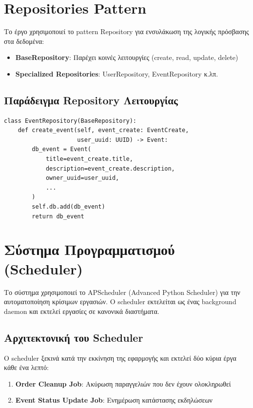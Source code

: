 \documentclass[12pt,a4paper]{report}
\begin{document}
\section{Repositories Pattern}

Το έργο χρησιμοποιεί το pattern Repository για ενσυλάκωση της λογικής πρόσβασης στα δεδομένα:

\begin{itemize}
    \item \textbf{BaseRepository}: Παρέχει κοινές λειτουργίες (create, read, update, delete)
    \item \textbf{Specialized Repositories}: UserRepository, EventRepository κ.λπ.
\end{itemize}

\subsection{Παράδειγμα Repository Λειτουργίας}

\begin{lstlisting}[caption=Repository Pattern Example]
class EventRepository(BaseRepository):
    def create_event(self, event_create: EventCreate,
                     user_uuid: UUID) -> Event:
        db_event = Event(
            title=event_create.title,
            description=event_create.description,
            owner_uuid=user_uuid,
            ...
        )
        self.db.add(db_event)
        return db_event
\end{lstlisting}

\section{Σύστημα Προγραμματισμού (Scheduler)}

Το σύστημα χρησιμοποιεί το APScheduler (Advanced Python Scheduler) για την αυτοματοποίηση κρίσιμων εργασιών. Ο scheduler εκτελείται ως ένας background daemon και εκτελεί εργασίες σε κανονικά διαστήματα.

\subsection{Αρχιτεκτονική του Scheduler}

Ο scheduler ξεκινά κατά την εκκίνηση της εφαρμογής και εκτελεί δύο κύρια έργα κάθε ένα λεπτό:

\begin{enumerate}
    \item \textbf{Order Cleanup Job}: Ακύρωση παραγγελιών που δεν έχουν ολοκληρωθεί
    \item \textbf{Event Status Update Job}: Ενημέρωση κατάστασης εκδηλώσεων
\end{enumerate}
\end{document}
